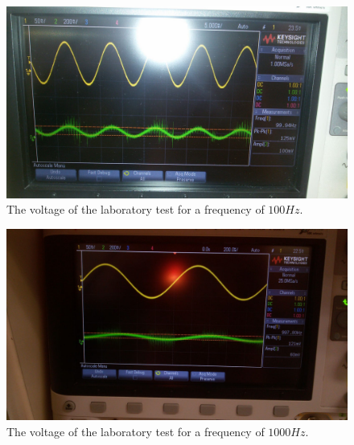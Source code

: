 \begin{figure}[H] 
\centering
\includegraphics[width=0.6\linewidth]{100Hz.jpeg}
\caption{The voltage of the laboratory test for a frequency of $100Hz$.}
\label{Fig10: 100Hz}
\end{figure}

\begin{figure}[H] 
\centering
\includegraphics[width=0.6\linewidth]{1000Hz.jpeg}
\caption{The voltage of the laboratory test for a frequency of $1000Hz$.}
\label{Fig11: 1000Hz}
\end{figure}
